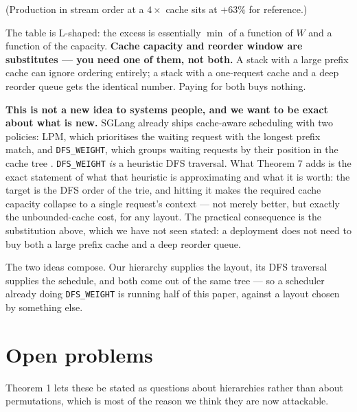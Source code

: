 \documentclass[11pt]{article}
\theoremstyle{plain}
\begin{document}
(Production in stream order at a $4\times$ cache sits at $+63\%$ for reference.)

The table is L-shaped: the excess is essentially $\min$ of a function of $W$ and a function of the capacity. \textbf{Cache capacity and reorder window are substitutes --- you need one of them, not both.} A stack with a large prefix cache can ignore ordering entirely; a stack with a one-request cache and a deep reorder queue gets the identical number. Paying for both buys nothing.

\textbf{This is not a new idea to systems people, and we want to be exact about what is new.} SGLang already ships cache-aware scheduling with two policies: LPM, which prioritises the waiting request with the longest prefix match, and \texttt{DFS\string\_WEIGHT}, which groups waiting requests by their position in the cache tree \cite{SGL}. \texttt{DFS\string\_WEIGHT} \emph{is} a heuristic DFS traversal. What Theorem 7 adds is the exact statement of what that heuristic is approximating and what it is worth: the target is the DFS order of the trie, and hitting it makes the required cache capacity collapse to a single request's context --- not merely better, but exactly the unbounded-cache cost, for any layout. The practical consequence is the substitution above, which we have not seen stated: a deployment does not need to buy both a large prefix cache and a deep reorder queue.

The two ideas compose. Our hierarchy supplies the layout, its DFS traversal supplies the schedule, and both come out of the same tree --- so a scheduler already doing \texttt{DFS\string\_WEIGHT} is running half of this paper, against a layout chosen by something else.


\section{Open problems}

Theorem 1 lets these be stated as questions about hierarchies rather than about permutations, which is most of the reason we think they are now attackable.
\end{document}
